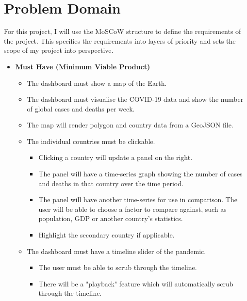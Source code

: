 \documentclass{report}
\begin{document}
\newpage


\chapter{Problem Domain}
For this project, I will use the MoSCoW structure to define the requirements of the project. This specifies the requirements into layers of priority and sets the scope of my project into perspective.\\
\begin{itemize}
    \item \textbf{\Large{Must Have (Minimum Viable Product)}}
    \begin{itemize}
        \item The dashboard must show a map of the Earth.
        \item The dashboard must visualise the COVID-19 data and show the number of global cases and deaths per week.
        \item The map will render polygon and country data from a GeoJSON file.
        \item The individual countries must be clickable.
        \begin{itemize}
            \item Clicking a country will update a panel on the right.
            \item The panel will have a time-series graph showing the number of cases and deaths in that country over the time period.
            \item The panel will have another time-series for use in comparison. The user will be able to choose a factor to compare against, such as population, GDP or another country's statistics.
            \item Highlight the secondary country if applicable.
        \end{itemize}
        \item The dashboard must have a timeline slider of the pandemic.
        \begin{itemize}
            \item The user must be able to scrub through the timeline.
            \item There will be a "playback" feature which will automatically scrub through the timeline.

\end{itemize}
\end{itemize}
\end{itemize}
\end{document}
